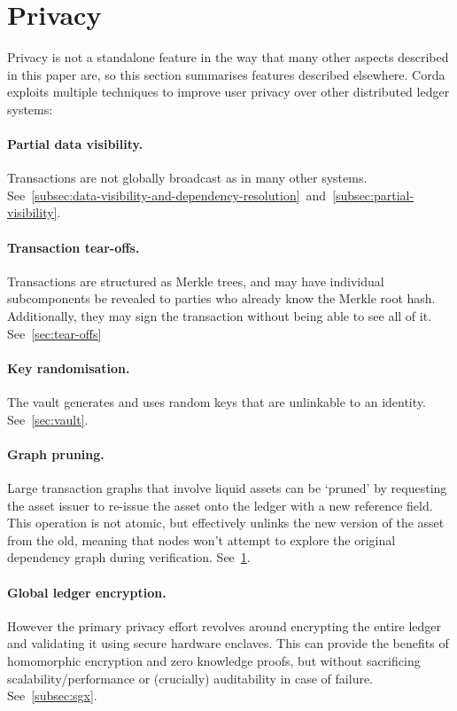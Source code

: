 \documentclass{article}
\begin{document}
\section{Privacy}\label{sec:privacy}

Privacy is not a standalone feature in the way that many other aspects described in this paper are, so this section
summarises features described elsewhere. Corda exploits multiple techniques to improve user privacy over other
distributed ledger systems:

\paragraph{Partial data visibility.}Transactions are not globally broadcast as in many other systems.
See~\cref{subsec:data-visibility-and-dependency-resolution}~and~\cref{subsec:partial-visibility}.

\paragraph{Transaction tear-offs.}Transactions are structured as Merkle trees, and may have individual
subcomponents be revealed to parties who already know the Merkle root hash. Additionally, they may sign the
transaction without being able to see all of it. See~\cref{sec:tear-offs}

\paragraph{Key randomisation.}The vault generates and uses random keys that are unlinkable to an identity.
See~\cref{sec:vault}.

\paragraph{Graph pruning.}Large transaction graphs that involve liquid assets can be `pruned' by requesting the asset
issuer to re-issue the asset onto the ledger with a new reference field. This operation is not atomic, but effectively
unlinks the new version of the asset from the old, meaning that nodes won't attempt to explore the original dependency
graph during verification. See~\cref{sec:privacy}.

\paragraph{Global ledger encryption.} However the primary privacy effort revolves around encrypting the entire
ledger and validating it using secure hardware enclaves. This can provide the benefits of homomorphic encryption
and zero knowledge proofs, but without sacrificing scalability/performance or (crucially) auditability in case of
failure. See~\cref{subsec:sgx}.
\end{document}
